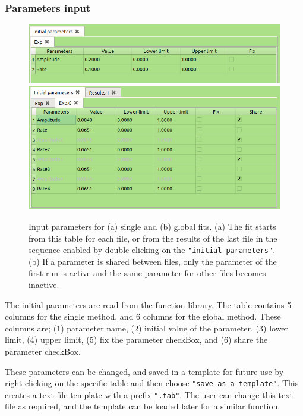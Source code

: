 \documentclass[10pt,letterpaper,oneside]{article}
\begin{document}

\subsubsection*{Parameters input}
\begin{figure}[!htb]
\center
\includegraphics[width=.9\textwidth]{analyze-table-s.png}
\includegraphics[width=.9\textwidth]{analyze-table-g.png}
 \caption{Input parameters for (a) single and (b) global fits. (a) The fit starts from this table for each file, or from the results of the last file in the sequence enabled by double clicking on the \texttt{"initial parameters"}. (b) If a parameter is shared between files, only the parameter of the first run is active and the same parameter for other files becomes inactive.}
 \label{fig-tables}
 \end{figure}
The initial parameters are read from the function library.
The table contains 5 columns for the single method, and 6 columns for the global method. These columns are; (1) parameter name, (2) initial value of the parameter, (3) lower limit, (4) upper limit, (5) fix the parameter checkBox, and (6) share the parameter checkBox.

These parameters can be changed, and saved in a template for future use  by right-clicking on the specific table and then choose \verb+"save as a template"+. This creates a text file template with a prefix \verb+".tab"+. The  user can change this text file as required, and the template can be loaded later for a similar function.

\end{document}
